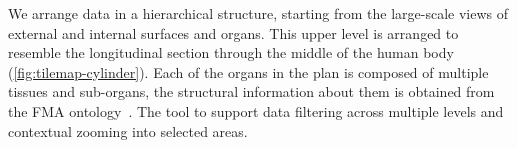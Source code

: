 
We arrange data in a hierarchical structure, starting from the large-scale views of external and internal surfaces and organs.
This upper level is arranged to resemble the longitudinal section through the middle of the human body (\cref{fig:tilemap-cylinder}).
Each of the organs in the plan is composed of multiple tissues and sub-organs, the structural information about them is obtained from the FMA ontology~\cite{RM03}. The tool to support data filtering across multiple levels and contextual zooming into selected areas.
